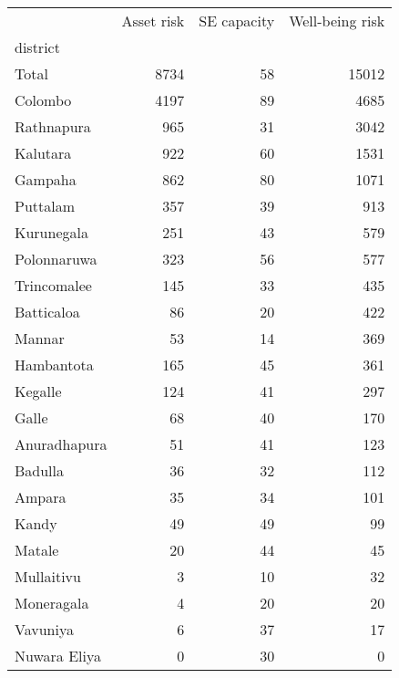 \begin{tabular}{lrrr}
\toprule
{} &  Asset risk &  SE capacity &  Well-being risk \\
district     &             &              &                  \\
\midrule
Total        &        8734 &           58 &            15012 \\
Colombo      &        4197 &           89 &             4685 \\
Rathnapura   &         965 &           31 &             3042 \\
Kalutara     &         922 &           60 &             1531 \\
Gampaha      &         862 &           80 &             1071 \\
Puttalam     &         357 &           39 &              913 \\
Kurunegala   &         251 &           43 &              579 \\
Polonnaruwa  &         323 &           56 &              577 \\
Trincomalee  &         145 &           33 &              435 \\
Batticaloa   &          86 &           20 &              422 \\
Mannar       &          53 &           14 &              369 \\
Hambantota   &         165 &           45 &              361 \\
Kegalle      &         124 &           41 &              297 \\
Galle        &          68 &           40 &              170 \\
Anuradhapura &          51 &           41 &              123 \\
Badulla      &          36 &           32 &              112 \\
Ampara       &          35 &           34 &              101 \\
Kandy        &          49 &           49 &               99 \\
Matale       &          20 &           44 &               45 \\
Mullaitivu   &           3 &           10 &               32 \\
Moneragala   &           4 &           20 &               20 \\
Vavuniya     &           6 &           37 &               17 \\
Nuwara Eliya &           0 &           30 &                0 \\
\bottomrule
\end{tabular}
